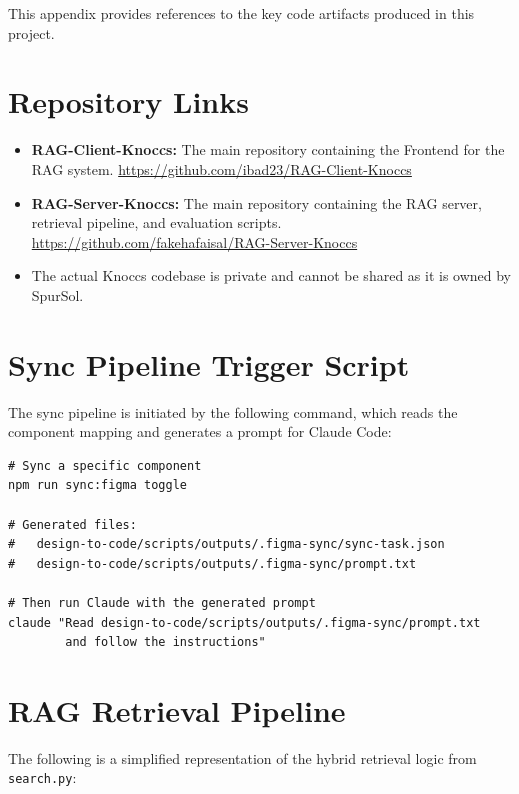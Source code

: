 This appendix provides references to the key code artifacts produced in this project.

\section{Repository Links}

\begin{itemize}
    \item \textbf{RAG-Client-Knoccs:} The main repository containing the Frontend for the RAG system. \url{https://github.com/ibad23/RAG-Client-Knoccs} 
    \item \textbf{RAG-Server-Knoccs:} The main repository containing the RAG server, retrieval pipeline, and evaluation scripts. \url{https://github.com/fakehafaisal/RAG-Server-Knoccs}
    \item The actual Knoccs codebase is private and cannot be shared as it is owned by SpurSol.
\end{itemize}

\section{Sync Pipeline Trigger Script}

The sync pipeline is initiated by the following command, which reads the component mapping and generates a prompt for Claude Code:

\begin{lstlisting}[showstringspaces=false, frame=single, basicstyle=\ttfamily\scriptsize, caption={Sync Usage}, label={lst:sync}]
# Sync a specific component
npm run sync:figma toggle

# Generated files:
#   design-to-code/scripts/outputs/.figma-sync/sync-task.json
#   design-to-code/scripts/outputs/.figma-sync/prompt.txt

# Then run Claude with the generated prompt
claude "Read design-to-code/scripts/outputs/.figma-sync/prompt.txt
        and follow the instructions"
\end{lstlisting}

\section{RAG Retrieval Pipeline}

The following is a simplified representation of the hybrid retrieval logic from \texttt{search.py}:

